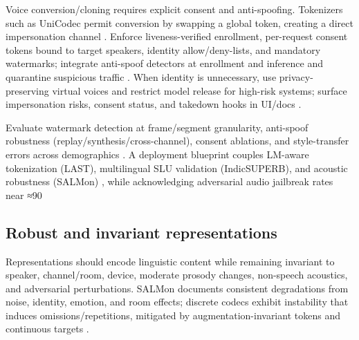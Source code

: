 \documentclass{article}
\begin{document}
Voice conversion/cloning requires explicit consent and anti-spoofing. Tokenizers such as UniCodec permit conversion by swapping a global token, creating a direct impersonation channel \cite{jiang2025universalspeechtokenlearninglowbitratene}. Enforce liveness-verified enrollment, per-request consent tokens bound to target speakers, identity allow/deny-lists, and mandatory watermarks; integrate anti-spoof detectors at enrollment and inference and quarantine suspicious traffic \cite{bai2025dmelspeechtokenizationmadesimple}. When identity is unnecessary, use privacy-preserving virtual voices and restrict model release for high-risk systems; surface impersonation risks, consent status, and takedown hooks in UI/docs \cite{zhao2024advancingspeechlanguagemodelsscalingsupe,park2025longformspeechgenerationspokenlanguagemo,gong2024seamlessexpressivelmspeechlanguagemodele}.

Evaluate watermark detection at frame/segment granularity, anti-spoof robustness (replay/synthesis/cross-channel), consent ablations, and style-transfer errors across demographics \cite{wang2025ssrspeechtowardsstablesaferobustzeroshot,bai2025dmelspeechtokenizationmadesimple,gong2024seamlessexpressivelmspeechlanguagemodele}. A deployment blueprint couples LM-aware tokenization (LAST), multilingual SLU validation (IndicSUPERB), and acoustic robustness (SALMon) \cite{turetzky2024lastlanguagemodelawarespeechtokenization,entry2025indicsuperbspeechprocessinguniversalperf,maimon2025salmonsuiteacousticlanguagemodelevaluati}, while acknowledging adversarial audio jailbreak rates near ≈90%

\subsection{Robust and invariant representations} \label{subsec:Robust and invariant representations}
Representations should encode linguistic content while remaining invariant to speaker, channel/room, device, moderate prosody changes, non-speech acoustics, and adversarial perturbations. SALMon documents consistent degradations from noise, identity, emotion, and room effects; discrete codecs exhibit instability that induces omissions/repetitions, mitigated by augmentation-invariant tokens and continuous targets \cite{maimon2025salmonsuiteacousticlanguagemodelevaluati,liu2024analyzingmitigatinginconsistencydiscrete,yuan2024continuousspeechtokensmakesllmsrobustmul,fily2024establishingdegreesclosenessbetweenaudio}.
\end{document}
